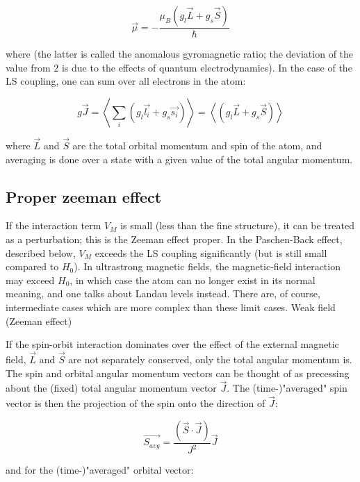 \begin{equation*}
\vec{\mu} = -\frac{\mu_B (g_l \vec{L} + g_s \vec{S})}{\hbar}
\end{equation*}

where  (the latter is called the anomalous gyromagnetic ratio; the deviation of the value from 2 is due to the effects of quantum electrodynamics). In the case of the LS coupling, one can sum over all electrons in the atom:

\begin{equation*}
g \vec{J} = \left\langle\sum_i (g_l \vec{l_i} + g_s \vec{s_i})\right\rangle = \left\langle (g_l\vec{L} + g_s \vec{S})\right\rangle
\end{equation*}

where $\vec{L}$ and $\vec{S}$ are the total orbital momentum and spin of the atom, and averaging is done over a state with a given value of the total angular momentum.

\subsection{Proper zeeman effect}

If the interaction term $V_M$ is small (less than the fine structure), it can be treated as a perturbation; this is the Zeeman effect proper. In the Paschen-Back effect, described below, $V_M$ exceeds the LS coupling significantly (but is still small compared to $H_{0}$). In ultrastrong magnetic fields, the magnetic-field interaction may exceed $H_0$, in which case the atom can no longer exist in its normal meaning, and one talks about Landau levels instead. There are, of course, intermediate cases which are more complex than these limit cases.
Weak field (Zeeman effect)

If the spin-orbit interaction dominates over the effect of the external magnetic field, $\vec{L}$ and $\vec{S}$ are not separately conserved, only the total angular momentum  is. The spin and orbital angular momentum vectors can be thought of as precessing about the (fixed) total angular momentum vector $\vec{J}$. The (time-)"averaged" spin vector is then the projection of the spin onto the direction of $\vec{J}$:

\begin{equation*}
\vec{S_{avg}} = \frac{(\vec{S} \cdot \vec{J})}{J^2} \vec{J}
\end{equation*}

and for the (time-)"averaged" orbital vector:

